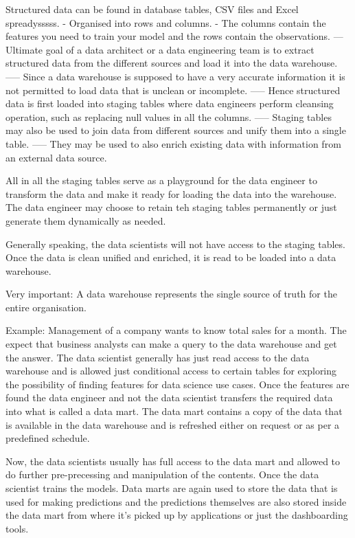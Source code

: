 \documentclass[a4paper, 11pt]{article}
\begin{document}
    Structured data can be found in database tables, CSV files and Excel spreadysssss.
    - Organised into rows and columns.
    - The columns contain the features you need to train your model and the rows contain the observations.
    --- Ultimate goal of a data architect or a data engineering team is to extract structured data from the different sources and load it into the data warehouse.
    ----- Since a data warehouse is supposed to have a very accurate information it is not permitted to load data that is unclean or incomplete.
    ----- Hence structured data is first loaded into staging tables where data engineers perform cleansing operation, such as replacing null values in all the columns.
    ----- Staging tables may also be used to join data from different sources and unify them into a single table.
    ----- They may be used to also enrich existing data with information from an external data source.

    All in all the staging tables serve as a playground for the data engineer to transform the data and make it ready for loading the data into the warehouse.
    The data engineer may choose to retain teh staging tables permanently or just generate them dynamically as needed.

    Generally speaking, the data scientists will not have access to the staging tables.
    Once the data is clean unified and enriched, it is read to be loaded into a data warehouse.

    Very important: A data warehouse represents the single source of truth for the entire organisation.

    Example:
    Management of a company wants to know total sales for a month. The expect that business analysts can make a query to the data warehouse and get the answer.
    The data scientist generally has just read access to the data warehouse and is allowed just conditional access to certain tables for exploring the possibility of finding features for data science use cases.
    Once the features are found the data engineer and not the data scientist transfers the required data into what is called a data mart.
    The data mart contains a copy of the data that is available in the data warehouse and is refreshed either on request or as per a predefined schedule.

    Now, the data scientists usually has full access to the data mart and allowed to do further pre-precessing and manipulation of the contents.
    Once the data scientist trains the models.
    Data marts are again used to store the data that is used for making predictions and the predictions themselves are also stored inside the data mart from where it's picked up by applications or just the dashboarding tools.
\end{document}

